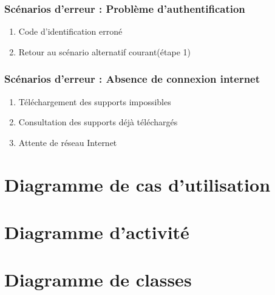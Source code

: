 {\subsubsection{Scénarios d'erreur : Problème d'authentification}

    \begin{enumerate}
        \item Code d'identification erroné
        \item Retour au scénario alternatif courant(étape 1)
\end{enumerate}

\subsubsection{Scénarios d'erreur : Absence de connexion internet}

    \begin{enumerate}
        \item Téléchargement des supports impossibles
        \item Consultation des supports déjà téléchargés 
        \item Attente de réseau Internet
\end{enumerate}

\newpage

\section{Diagramme de cas d'utilisation}



\section{Diagramme d'activité}


\section{Diagramme de classes}




}
